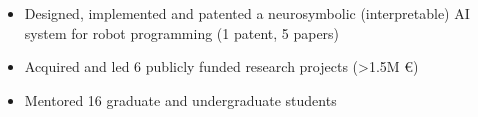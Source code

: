 \medskip

\begin{itemize}
  \item Designed, implemented and patented a neurosymbolic (interpretable) AI system for robot programming (1 patent, 5 papers)
  \item Acquired and led 6 publicly funded research projects (>1.5M €)
  \item Mentored 16 graduate and undergraduate students
\end{itemize}







